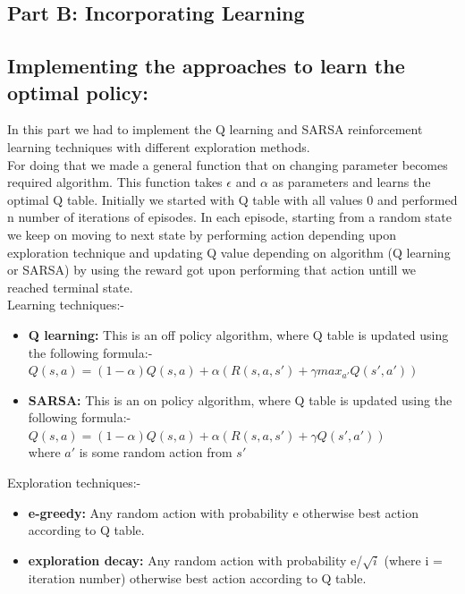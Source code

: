 \documentclass{article}
\begin{document}
\begin{enumerate}[a)]
\pagebreak

\section{Part B: Incorporating Learning}


\subsection{Implementing the approaches to learn the optimal policy:}
In this part we had to implement the Q learning and SARSA reinforcement learning techniques with different exploration methods.\\
For doing that we made a general function that on changing parameter becomes required algorithm. This function takes $\epsilon$ and $\alpha$ as
parameters and learns the optimal Q table. Initially we started with Q table with all values 0 and performed n number of iterations of episodes. In 
each episode, starting from a random state we keep on moving to next state by performing action depending upon exploration technique and updating Q value depending on
algorithm (Q learning or SARSA) by using the reward got upon performing that action untill we reached terminal state. \\

Learning techniques:- 
\begin{itemize}
    \item \textbf{Q learning: }  This is an off policy algorithm, where Q table is updated using the following formula:-\\ 
        $ Q(s,a) = (1-\alpha)Q(s,a) + \alpha(R(s,a,s') + \gamma max_{a'}Q(s',a'))$
    \item \textbf{SARSA: }  This is an on policy algorithm, where Q table is updated using the following formula:- \\
    $ Q(s,a) = (1-\alpha)Q(s,a) + \alpha(R(s,a,s') + \gamma Q(s',a'))$\\
    where $a'$ is some random action from $s'$\\
\end{itemize}

Exploration techniques:- 
\begin{itemize}
    \item \textbf{e-greedy: } Any random action with probability e otherwise best action according to Q table.
    \item \textbf{exploration decay: } Any random action with probability e/$\sqrt{i}$ (where i = iteration number) otherwise best action according to Q table.
\end{itemize}



\end{enumerate}
\end{document}
